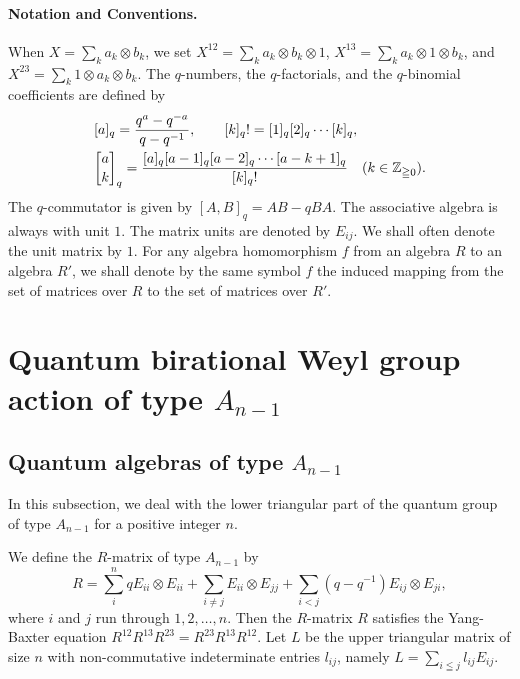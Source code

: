 \documentclass[12pt,twoside]{article}
\newcommand\ot{\otimes}
\newcommand\Z{{\mathbb Z}} %
\theoremstyle{plain} %
\theoremstyle{definition} %
\theoremstyle{definition} %
\numberwithin{theorem}{section}
\numberwithin{equation}{section}
\numberwithin{figure}{section}
\numberwithin{table}{section}
\begin{document}
\paragraph{Notation and Conventions.}
When $X = \sum_k a_k\ot b_k$, we set 
$X^{12}=\sum_k a_k\ot b_k\ot 1$, 
$X^{13}=\sum_k a_k\ot 1\ot b_k$, and
$X^{23}=\sum_k 1\ot a_k\ot b_k$.
The $q$-numbers, the $q$-factorials, and the $q$-binomial coefficients are defined by
\begin{align*}
 &
 [a]_q = \frac{q^a-q^{-a}}{q-q^{-1}}, \qquad
 [k]_q! = [1]_q[2]_q\cdots[k]_q, \quad
 \\ &
 \qbinom{a}{k}_q =
 \frac{[a]_q[a-1]_q[a-2]_q\cdots[a-k+1]_q}{[k]_q!}
 \quad  (k\in\Z_{\geqq0}).
\end{align*}
The $q$-commutator is given by $[A,B]_q=AB-qBA$.
The associative algebra is always with unit $1$. 
The matrix units are denoted by $E_{ij}$.
We shall often denote the unit matrix by $1$.
For any algebra homomorphism $f$ from an algebra $R$ to an algebra $R'$,
we shall denote by the same symbol $f$
the induced mapping from the set of matrices over $R$
to the set of matrices over $R'$.


\section{Quantum birational Weyl group action of type $A_{n-1}$}
\label{sec:A_{n-1}}


\subsection{Quantum algebras of type $A_{n-1}$}
\label{sec:quantum-alg-A_{n-1}}

In this subsection, we deal with the lower triangular part of 
the quantum group of type $A_{n-1}$ for a positive integer $n$.

We define the $R$-matrix of type $A_{n-1}$ by
\begin{equation}
 R 
 = \sum_i^n q E_{ii}\ot E_{ii}
 + \sum_{i\ne j} E_{ii}\ot E_{jj}
 + \sum_{i<j} (q-q^{-1}) E_{ij}\ot E_{ji},
 \label{eq:def-R}
\end{equation}
where $i$ and $j$ run through $1,2,\ldots,n$.
Then the $R$-matrix $R$ satisfies the Yang-Baxter equation
$R^{12}R^{13}R^{23} = R^{23}R^{13}R^{12}$.
Let $L$ be the upper triangular matrix of size $n$ with 
non-commutative indeterminate entries $l_{ij}$,
namely $L = \sum_{i\leqq j} l_{ij} E_{ij}$.
\end{document}
